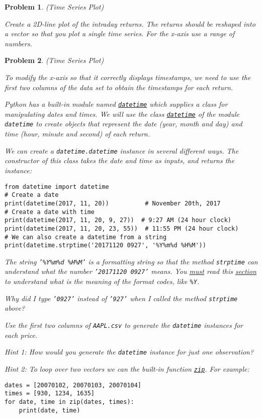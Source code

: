 \documentclass[12pt, a4paper]{article}
\newtheorem{problem}{Problem}
\begin{document}
\begin{problem}
(Time Series Plot)

Create a 2D-line plot of the intraday returns.
The returns should be reshaped into a vector so that you plot a single time series.
For the x-axis use a range of numbers.
\end{problem}

\begin{problem}
(Time Series Plot)

To modify the x-axis so that it correctly displays timestamps, we need to use the first two columns of the data set to obtain the timestamps for each return.

Python has a built-in module named \href{https://docs.python.org/3.6/library/datetime.html}{\texttt{datetime}} which supplies a class for manipulating dates and times.
We will use the class \href{https://docs.python.org/3.6/library/datetime.html\#datetime-objects}{\texttt{datetime}} of the module \texttt{datetime} to create objects that represent the date (year, month and day) and time (hour, minute and second) of each return.

We can create a \texttt{datetime.datetime} instance in several different ways.
The constructor of this class takes the date and time as inputs, and returns the instance:
\lstset{language=jupyter-python,label= ,caption= ,captionpos=b,numbers=none}
\begin{lstlisting}
from datetime import datetime
# Create a date
print(datetime(2017, 11, 20))          # November 20th, 2017
# Create a date with time
print(datetime(2017, 11, 20, 9, 27))  # 9:27 AM (24 hour clock)
print(datetime(2017, 11, 20, 23, 55))  # 11:55 PM (24 hour clock)
# We can also create a datetime from a string
print(datetime.strptime('20171120 0927', '%Y%m%d %H%M'))
\end{lstlisting}
The string \texttt{'\%Y\%m\%d \%H\%M'} is a formatting string so that the method \texttt{strptime} can understand what the number \texttt{'20171120 0927'} means.
You \uline{must} read this \href{https://docs.python.org/3.6/library/datetime.html\#strftime-and-strptime-behavior}{section} to understand what is the meaning of the format codes, like \texttt{\%Y}.

Why did I type \texttt{'0927'} instead of \texttt{'927'} when I called the method \texttt{strptime} above?

Use the first two columns of \texttt{AAPL.csv} to generate the \texttt{datetime} instances for each price.

Hint 1: How would you generate the \texttt{datetime} instance for just one observation?

Hint 2: To loop over two vectors we can the built-in function \href{https://docs.python.org/3.6/library/functions.html\#zip}{\texttt{zip}}. For example:
\lstset{language=jupyter-python,label= ,caption= ,captionpos=b,numbers=none}
\begin{lstlisting}
dates = [20070102, 20070103, 20070104]
times = [930, 1234, 1635]
for date, time in zip(dates, times):
    print(date, time)
\end{lstlisting}
\end{problem}
\end{document}
